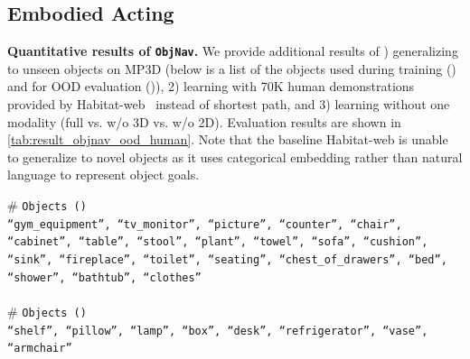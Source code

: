 \subsection{Embodied Acting}\label{sec:result_objnav_additional}

\textbf{Quantitative results of \texttt{ObjNav}.} We provide additional results of ) generalizing to unseen objects on MP3D (below is a list of the objects used during training ({\color{mygreen}{seen}}) and for OOD evaluation ({\color{myred}{unseen}})), 2) learning with 70K human demonstrations provided by Habitat-web~\citep{ramrakhya2022habitat} instead of shortest path, and 3) learning without one modality (full vs. w/o 3D vs. w/o 2D). Evaluation results are shown in \cref{tab:result_objnav_ood_human}. Note that the baseline Habitat-web is unable to generalize to novel objects as it uses categorical embedding rather than natural language to represent object goals.
\begin{tcolorbox}
\begin{minipage}{\linewidth}
\# \texttt{Objects ({\color{mygreen}{seen}})}\\ \texttt{``gym\_equipment'', ``tv\_monitor'', ``picture'', ``counter'', ``chair'', ``cabinet'', ``table'', ``stool'', ``plant'', ``towel'', ``sofa'', ``cushion'', ``sink'', ``fireplace'', ``toilet'', ``seating'', ``chest\_of\_drawers'', ``bed'', ``shower'', ``bathtub'', ``clothes''} \\
\\
\# \texttt{Objects ({\color{myred}{unseen}})}\\ \texttt{``shelf'', ``pillow'', ``lamp'', ``box'', ``desk'', ``refrigerator'', ``vase'', ``armchair''} 
\end{minipage}
\end{tcolorbox}

